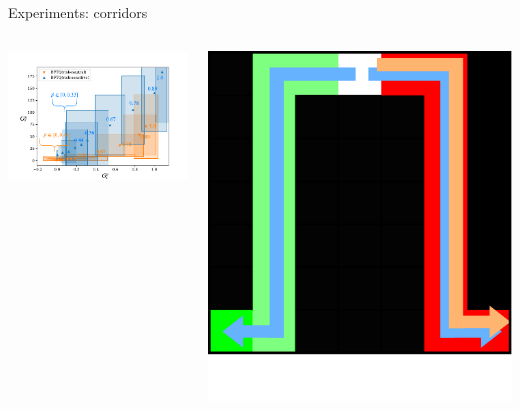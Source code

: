 \documentclass{beamer}
\begin{document}
    \begin{frame}{Experiments: corridors}

        \begin{columns}
            \begin{column}{0.7\textwidth}
                \includegraphics[page=1, width=\textwidth]{talk/img/corridors}
            \end{column}
            \begin{column}{0.3\textwidth}  %
                \begin{center}
                    \includegraphics[width=\textwidth]{talk/img/test.pdf}
                \end{center}
            \end{column}
        \end{columns}
    \end{frame}
\end{document}
